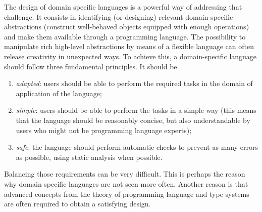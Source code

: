 \documentclass{llncs}
\begin{document}
The design of domain specific languages is a powerful way of addressing
that challenge. It consists in identifying (or designing) relevant
domain-specific abstractions (construct well-behaved objects equipped
with enough operations) and make them available through a programming
language.
The possibility to manipulate rich high-level abstractions
by means of a flexible language
can often release creativity in unexpected ways.
To achieve this, a domain-specific language
should follow three fundamental principles. It should be
\begin{enumerate}
\item \emph{adapted}: users should be able to perform the required
  tasks in the domain of application of the language;
\item \emph{simple}: users should be able to perform the tasks in a simple way
  (this means that the language should be reasonably concise, but also
   understandable by users who might not be programming language experts);
\item \emph{safe}: the language should perform automatic checks
  to prevent as many errors as possible, using static analysis when
  possible.
\end{enumerate}
Balancing those requirements can be very difficult. This is perhaps
the reason why domain specific languages are not seen more often.
Another reason is that advanced concepts from the theory of
programming language and type systems
are often required to obtain a satisfying design.
\end{document}
